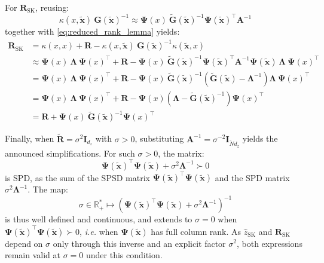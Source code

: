 For $\mathbf{R}_{\mathrm{SK}}$, reusing:
\begin{equation}
	\kappa(x,\tilde{\mathbf{x}})\:\mathbf{G}(\tilde{\mathbf{x}})^{-1}\approx\boldsymbol{\Psi}(x)\:\tilde{\mathbf{G}}(\tilde{\mathbf{x}})^{-1}\boldsymbol{\Psi}(\tilde{\mathbf{x}})^\top \mathbf{A}^{-1}
\end{equation}
together with \eqref{eq:reduced_rank_lemma} yields:
\begin{equation}
	\begin{aligned}
	\mathbf{R}_{\mathrm{SK}}&=\kappa(x,x)+\mathbf{R}-\kappa(x,\tilde{\mathbf{x}})\:\mathbf{G}(\tilde{\mathbf{x}})^{-1}\kappa(\tilde{\mathbf{x}},x)\\
	&\approx\boldsymbol{\Psi}(x)\:\boldsymbol{\Lambda}\:\boldsymbol{\Psi}(x)^\top+\mathbf{R}-\boldsymbol{\Psi}(x)\:\tilde{\mathbf{G}}(\tilde{\mathbf{x}})^{-1}\boldsymbol{\Psi}(\tilde{\mathbf{x}})^\top \mathbf{A}^{-1}\boldsymbol{\Psi}(\tilde{\mathbf{x}})\:\boldsymbol{\Lambda}\:\boldsymbol{\Psi}(x)^\top\\
	&=\boldsymbol{\Psi}(x)\:\boldsymbol{\Lambda}\:\boldsymbol{\Psi}(x)^\top+\mathbf{R}-\boldsymbol{\Psi}(x)\:\tilde{\mathbf{G}}(\tilde{\mathbf{x}})^{-1}\left(\tilde{\mathbf{G}}(\tilde{\mathbf{x}})-\boldsymbol{\Lambda}^{-1}\right)\boldsymbol{\Lambda}\:\boldsymbol{\Psi}(x)^\top\\
	&=\boldsymbol{\Psi}(x)\:\boldsymbol{\Lambda}\:\boldsymbol{\Psi}(x)^\top+\mathbf{R}-\boldsymbol{\Psi}(x)\left(\boldsymbol{\Lambda}-\tilde{\mathbf{G}}(\tilde{\mathbf{x}})^{-1}\right)\boldsymbol{\Psi}(x)^\top\\
	&=\mathbf{R}+\boldsymbol{\Psi}(x)\:\tilde{\mathbf{G}}(\tilde{\mathbf{x}})^{-1}\boldsymbol{\Psi}(x)^\top
	\end{aligned}
\end{equation}

Finally, when $\tilde{\mathbf{R}}=\sigma^2\mathbf{I}_{d_z}$ with $\sigma>0$, substituting $\mathbf{A}^{-1}=\sigma^{-2}\mathbf{I}_{\tilde{N}d_z}$ yields the announced simplifications. For such $\sigma>0$, the matrix:
\begin{equation}
	\boldsymbol{\Psi}(\tilde{\mathbf{x}})^\top\boldsymbol{\Psi}(\tilde{\mathbf{x}})+\sigma^2\boldsymbol{\Lambda}^{-1}\succ0
\end{equation}
is SPD, as the sum of the SPSD matrix $\boldsymbol{\Psi}(\tilde{\mathbf{x}})^\top\boldsymbol{\Psi}(\tilde{\mathbf{x}})$ and the SPD matrix $\sigma^2\boldsymbol{\Lambda}^{-1}$. The map:
\begin{equation}
	\sigma\in\mathbb{R}_+^*\mapsto\left(\boldsymbol{\Psi}(\tilde{\mathbf{x}})^\top\boldsymbol{\Psi}(\tilde{\mathbf{x}})+\sigma^2\boldsymbol{\Lambda}^{-1}\right)^{-1}
\end{equation}
is thus well defined and continuous, and extends to $\sigma=0$ when $\boldsymbol{\Psi}(\tilde{\mathbf{x}})^\top\boldsymbol{\Psi}(\tilde{\mathbf{x}})\succ0$, \textit{i.e.} when $\boldsymbol{\Psi}(\tilde{\mathbf{x}})$ has full column rank. As $\hat{z}_{\mathrm{SK}}$ and $\mathbf{R}_{\mathrm{SK}}$ depend on $\sigma$ only through this inverse and an explicit factor $\sigma^2$, both expressions remain valid at $\sigma=0$ under this condition.

